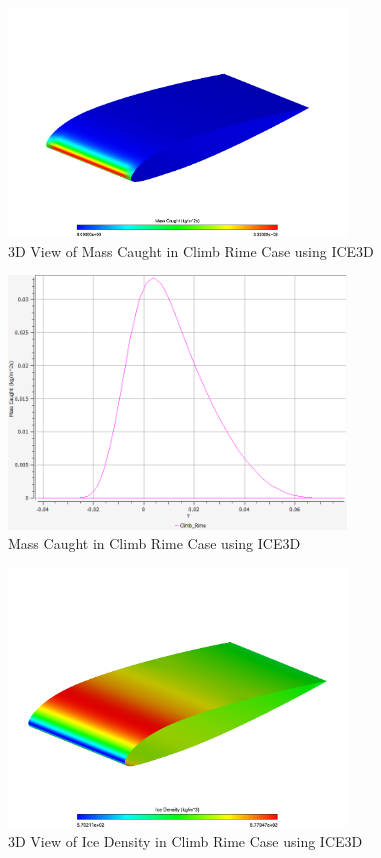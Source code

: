 \documentclass[english]{kththesis}
\begin{document}
\begin{figure}[!htb]
    \centering
    \includegraphics[width=0.8\textwidth]{IPS/Mass_Caught_Climb_Rime_3D.png}
    \caption{3D View of Mass Caught in Climb Rime Case using ICE3D}
    \label{fig:Ice_Shape_Climb_Rime_3D}
\end{figure}
\begin{figure}[!htb]
    \centering
    \includegraphics[width=0.8\textwidth]{IPS/Mass_Caught_Climb_Rime_2D.png}
    \caption{Mass Caught in Climb Rime Case using ICE3D}
    \label{fig:Ice_Shape_Climb_Rime_2D}
\end{figure}
\begin{figure}[!ht]
    \centering
    \includegraphics[width=0.8\textwidth]{IPS/Ice_Density_Climb_Rime_3D.png}
    \caption{3D View of Ice Density in Climb Rime Case using ICE3D}
    \label{fig:Ice_Density_Climb_Rime_3D}
\end{figure}
\end{document}
